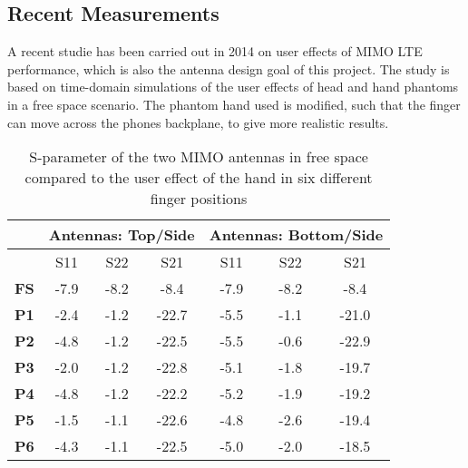 \subsection{Recent Measurements}
A recent studie has been carried out in 2014 on user effects of MIMO LTE performance, which is also the antenna design goal of this project. The study is based on time-domain simulations of the user effects of head and hand phantoms in a free space scenario. The phantom hand used is modified, such that the finger can move across the phones backplane, to give more realistic results. 

\begin{table}[]
\centering
\begin{tabular}{|c|c|c|c|c|c|c|}
\hline
            & \multicolumn{3}{c|}{\textbf{Antennas: Top/Side}} & \multicolumn{3}{c|}{\textbf{Antennas: Bottom/Side}} \\ \hline
            & S11            & S22            & S21            & S11             & S22             & S21             \\ \hline
\textbf{FS} & -7.9           & -8.2           & -8.4           & -7.9            & -8.2            & -8.4            \\ \hline
\textbf{P1} & -2.4           & -1.2           & -22.7          & -5.5            & -1.1            & -21.0           \\ \hline
\textbf{P2} & -4.8           & -1.2           & -22.5          & -5.5            & -0.6            & -22.9           \\ \hline
\textbf{P3} & -2.0           & -1.2           & -22.8          & -5.1            & -1.8            & -19.7           \\ \hline
\textbf{P4} & -4.8           & -1.2           & -22.2          & -5.2            & -1.9            & -19.2           \\ \hline
\textbf{P5} & -1.5           & -1.1           & -22.6          & -4.8            & -2.6            & -19.4           \\ \hline
\textbf{P6} & -4.3           & -1.1           & -22.5          & -5.0            & -2.0            & -18.5           \\ \hline
\end{tabular}
\caption{S-parameter of the two MIMO antennas in free space compared to the user effect of the hand in six different finger positions \cite{Samantha2014UserEff}}
\label{tab:usereff_s11}
\end{table}

